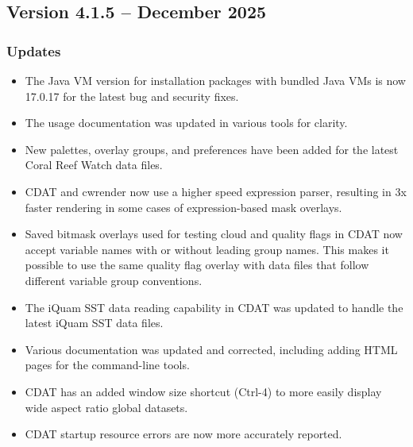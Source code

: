 
\subsection*{Version 4.1.5 -- December 2025}

\subsubsection*{ Updates}

\begin{itemize}

\item The Java VM version for installation packages with bundled Java 
VMs is now 17.0.17 for the latest bug and security fixes.

\item The usage documentation was updated in various tools for clarity.

\item New palettes, overlay groups, and preferences have been added for the 
latest Coral Reef Watch data files.

\item CDAT and cwrender now use a higher speed expression parser, resulting
in 3x faster rendering in some cases of expression-based mask overlays.

\item Saved bitmask overlays used for testing cloud and quality flags
in CDAT now accept variable names with or without leading group names.
This makes it possible to use the same quality flag overlay with data files
that follow different variable group conventions.

\item The iQuam SST data reading capability in CDAT was updated to handle
the latest iQuam SST data files.

\item Various documentation was updated and corrected, including adding HTML
pages for the command-line tools.

\item CDAT has an added window size shortcut (Ctrl-4) to more easily display
wide aspect ratio global datasets.

\item CDAT startup resource errors are now more accurately reported.

\end{itemize}

